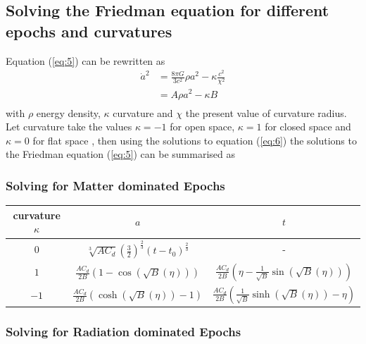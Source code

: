 \documentclass[a4paper, 11pt]{FSKH_623_Report}
\numberwithin{equation}{section}
\newcommand{\brac}[1]{\left(#1\right)}
\begin{document}
\subsection{Solving the Friedman equation for different epochs and curvatures}
Equation (\ref{eq:5}) can be rewritten as \citep{notes4}
\begin{equation}
\begin{split}\label{eq:CurvFriedman}
\dot{a}^{2} &= \frac{8\pi G}{3c^{2}}\rho a^{2}-\kappa\frac{c^{2}}{\chi^{2}}\\
&= A\rho a^{2}-\kappa B\\
\end{split}
\end{equation}
with $\rho$ energy density, $\kappa$ curvature and $\chi$ the present value of curvature radius. Let curvature take the values $\kappa=-1$ for open space, $\kappa=1$ for closed space and $\kappa=0$ for flat space \citep{Curv}, then using the solutions to equation (\ref{eq:6}) the solutions to the Friedman equation (\ref{eq:5}) can be summarised as
\subsubsection{Solving for Matter dominated Epochs}
\begin{table}[H]
\centering
\begin{tabular}{| c | c | c |}
\hline\hline
curvature $\kappa$ &$a$  &$t$ \\
\hline\hline
$0$  &$\sqrt[3]{AC_{d}}\brac{\frac{3}{2}}^\frac{2}{3}\brac{t-t_{0}}^{\frac{2}{3}}$ & - \\
\hline
$1$  &$\frac{AC_{d}}{2B}\brac{1-\cos\brac{\sqrt{B}\brac{\eta}}}$ & $\frac{AC_{d}}{2B}\brac{\eta-\frac{1}{\sqrt{B}}\sin\brac{\sqrt{B}\brac{\eta}}}$ \\
\hline
$-1$  & $\frac{AC_{d}}{2B}\brac{\cosh\brac{\sqrt{B}\brac{\eta}}-1}$ & $\frac{AC_{d}}{2B}\brac{\frac{1}{\sqrt{B}}\sinh\brac{\sqrt{B}\brac{\eta}}-\eta}$ \\
\hline
\end{tabular}
\end{table}
\subsubsection{Solving for Radiation dominated Epochs}
\end{document}
